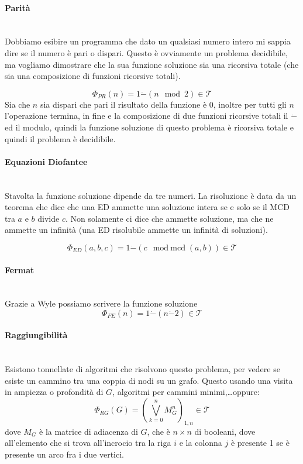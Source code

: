 \documentclass{article}
\begin{document}
\paragraph{Parità}\mbox{}\\
Dobbiamo esibire un programma che dato un qualsiasi numero intero mi sappia dire se il numero è
pari o dispari. Questo è ovviamente un problema decidibile, ma vogliamo dimostrare che la
sua funzione soluzione sia una ricorsiva totale (che sia una composizione di funzioni
ricorsive totali).

$$\Phi_{PR}(n)=1\dot{-}(n\mod{2}) \in\mathcal{T}$$
Sia che $n$ sia dispari che pari il risultato della funzione è 0, inoltre per tutti gli $n$
l'operazione termina, in fine e la composizione di due funzioni ricorsive totali il $\dot{-}$
ed il modulo, quindi la funzione soluzione di questo problema è ricorsiva totale e quindi
il problema è decidibile.

\paragraph{Equazioni Diofantee}\mbox{}\\
Stavolta la funzione soluzione dipende da tre numeri. La risoluzione
è data da un teorema che dice che una ED ammette una soluzione intera se e solo se il MCD
tra $a$ e $b$ divide $c$. Non solamente ci dice che ammette soluzione,
ma che ne ammette un infinità (una ED risolubile ammette un infinità di soluzioni).

$$\Phi_{ED}(a,b,c)=1\dot{-}(c\mod\text{mcd}(a,b))\in\mathcal{T}$$

\paragraph{Fermat}\mbox{}\\
Grazie a Wyle possiamo scrivere la funzione soluzione
$$\Phi_{FE}(n)=1\dot{-}(n\dot{-}2)\in\mathcal{T}$$

\paragraph{Raggiungibilità}\mbox{}\\
Esistono tonnellate di algoritmi che risolvono questo problema, per vedere se esiste
un cammino tra una coppia di nodi su un grafo. Questo usando una visita
in ampiezza o profondità di $G$, algoritmi per cammini minimi,\dots oppure:
$$\Phi_{RG}(G)=\left(\bigvee^n_{k=0} M_G^n\right)_{1,n}\in\mathcal{T}$$
dove $M_G$ è la matrice di adiacenza di $G$, che è $n\times n$ di booleani, dove
all'elemento che si trova all'incrocio tra la riga $i$ e la colonna $j$ è presente
1 se è presente un arco fra i due vertici.
\end{document}
